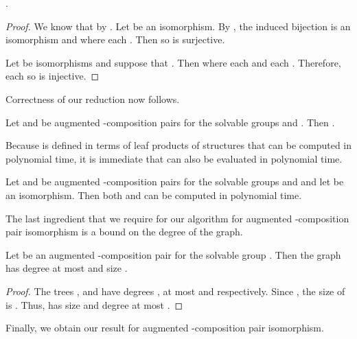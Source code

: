 \begin{theorem}
\label{thm:X-fff}
.
\end{theorem}

\begin{proof}
We know that  by .  Let  be an isomorphism.  By , the induced bijection  is an isomorphism and  where each .  Then  so  is surjective.

Let  be isomorphisms and suppose that .  Then  where each  and each .  Therefore, each  so  is injective.
\end{proof}

Correctness of our reduction now follows.

\begin{corollary}
  \label{cor:aug-alpha-red-cor}
  Let  and  be augmented -composition pairs for the solvable groups  and .  Then  \ifft .
\end{corollary}

Because  is defined in terms of leaf products of structures that can be computed in polynomial time, it is immediate that  can also be evaluated in polynomial time.

\begin{lemma}
  \label{lem:X-poly}
  Let  and  be augmented -composition pairs for the solvable groups  and  and let  be an isomorphism.  Then both  and  can be computed in polynomial time.
\end{lemma}

The last ingredient that we require for our algorithm for augmented -composition pair isomorphism is a bound on the degree of the graph.

\begin{lemma}
  \label{lem:aug-alpha-graph}
  Let  be an augmented -composition pair for the solvable group .  Then the graph  has degree at most  and size .
\end{lemma}

\begin{proof}
  The trees ,  and  have degrees , at most  and  respectively.  Since , the size of  is .  Thus,  has size  and degree at most .
\end{proof}

Finally, we obtain our result for augmented -composition pair isomorphism.

